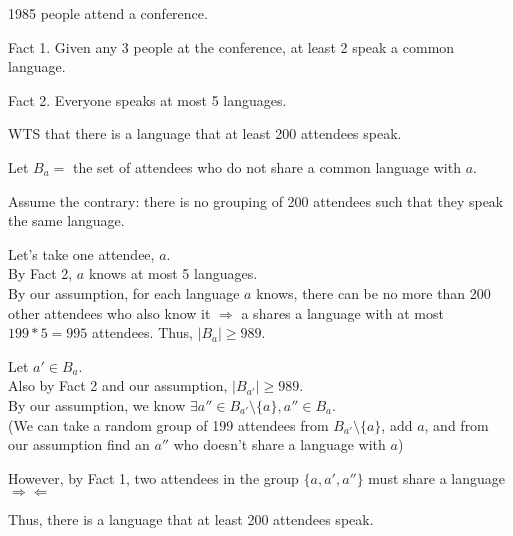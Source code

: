 \documentclass[fleqn]{article}
\begin{document}
1985 people attend a conference.

Fact 1. Given any 3 people at the conference, 
at least 2 speak a common language.

Fact 2. Everyone speaks at most 5 languages.

WTS that there is a language that at least 200 attendees speak.

Let $B_a = $ the set of attendees who do not share a common language with $a$.

Assume the contrary: there is no grouping of 200 attendees such that they speak the same language.

Let's take one attendee, $a$.\\
By Fact 2, $a$ knows at most 5 languages.\\
By our assumption, for each language $a$ knows, there can be no more than 200 other attendees who also know it $\Rightarrow$ a shares a language with at most $199*5=995$ attendees. Thus, $|B_a| \geq 989$.

Let $a' \in B_a$.\\
Also by Fact 2 and our assumption, $|B_{a'}| \geq 989$.\\
By our assumption, we know 
$\exists a'' \in B_{a'} \setminus \lbrace a \rbrace, a'' \in B_a$.\\
(We can take a random group of 199 attendees from $B_{a'} \setminus \lbrace a \rbrace$, add $a$, and from our assumption find an $a''$ who doesn't share a language with $a$)

However, by Fact 1, two attendees in the group 
$\lbrace a, a', a'' \rbrace$ must share a language 
$\Rightarrow \Leftarrow$

Thus, there is a language that at least 200 attendees speak.
\end{document}
